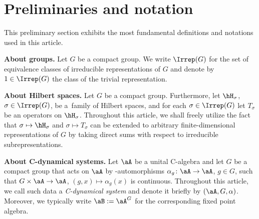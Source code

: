 \section{Preliminaries and notation}\label{sec:pre}

This preliminary section exhibits the most fundamental definitions and notations used in this article.

{\bf About groups.}
Let $G$ be a compact group.
We write $\Irrep(G)$ for the set of equivalence classes of irreducible representations of $G$ and denote by $1 \in \Irrep(G)$ the class of the trivial representation.

{\bf About Hilbert spaces.}
Let $G$ be a compact group.
Furthermore, let $\hH_\sigma$, $\sigma \in \Irrep(G)$, be a~family of Hilbert spaces, and for each $\sigma \in \Irrep(G)$ let $T_\sigma$ be an operators on $\hH_\sigma$.
Throughout this article, we shall freely utilize the fact that $\sigma \mapsto \hH_\sigma$ and $\sigma \mapsto T_\sigma$ can be extended to arbitrary finite-dimensional representations of $G$ by taking direct sums with respect to irreducible subrepresentations.

{\bf About C\Star-dynamical systems.}
Let $\aA$ be a unital C\Star-algebra and let $G$ be a compact group that acts on $\aA$ by \Star-automorphisms $\alpha_g\colon \aA \to \aA$, $g \in G$, such that $G \times \aA \to \aA$, $(g,x) \mapsto \alpha_g(x)$ is continuous.
Throughout this article, we call such data a \emph{C\Star-dynamical system} and denote it briefly by $(\aA,G,\alpha)$.
Moreover, we typically write $\aB := \aA^G$ for the corresponding fixed point algebra.

